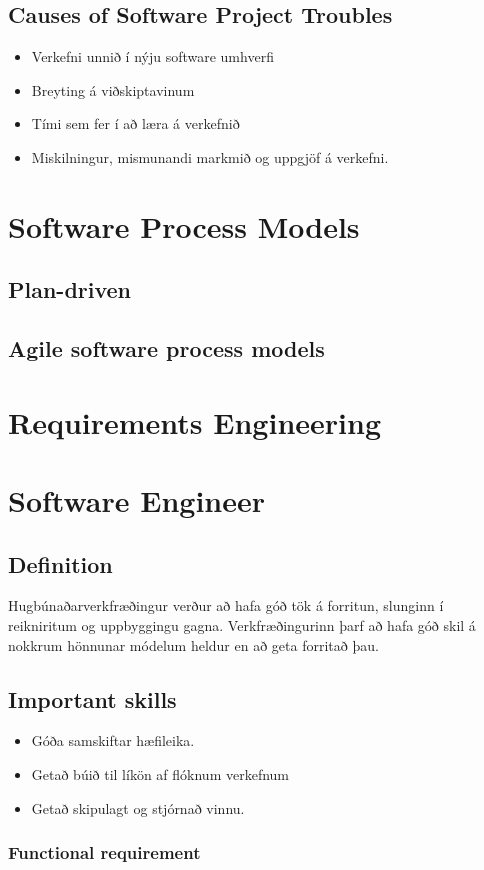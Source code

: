 \documentclass[]{article}
\begin{document}
\subsection{Causes of Software Project Troubles}
\begin{itemize}
	\item Verkefni unnið í nýju software umhverfi
	\item Breyting á viðskiptavinum 
	\item Tími sem fer í að læra á verkefnið
	\item Miskilningur, mismunandi markmið og uppgjöf á verkefni.
\end{itemize}
\section{Software Process Models}
\subsection{Plan-driven}
\subsection{Agile software process models}
\section{Requirements Engineering}
\section{Software Engineer}
\subsection{Definition}
Hugbúnaðarverkfræðingur verður að hafa góð tök á forritun, slunginn í reikniritum og uppbyggingu gagna. Verkfræðingurinn þarf að hafa góð skil á nokkrum hönnunar módelum heldur en að geta forritað þau.
\subsection{Important skills}
\begin{itemize}
	\item Góða samskiftar hæfileika.
	\item Getað búið til líkön af flóknum verkefnum
	\item Getað skipulagt og stjórnað vinnu.
\end{itemize}
\subsubsection{Functional requirement}
\end{document}
